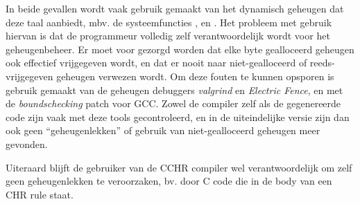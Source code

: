 In beide gevallen wordt vaak gebruik gemaakt van het dynamisch geheugen dat deze taal aanbiedt, mbv. de systeemfuncties ,  en . Het probleem met gebruik hiervan is dat de programmeur volledig zelf verantwoordelijk wordt voor het geheugenbeheer. Er moet voor gezorgd worden dat elke byte gealloceerd geheugen ook effectief vrijgegeven wordt, en dat er nooit naar niet-gealloceerd of reeds-vrijgegeven geheugen verwezen wordt. Om deze fouten te kunnen opsporen is gebruik gemaakt van de geheugen debuggers {\em valgrind} en {\em Electric Fence}, en met de  {\em boundschecking} patch voor GCC. Zowel de compiler zelf als de gegenereerde code zijn vaak met deze tools gecontroleerd, en in de uiteindelijke versie zijn dan ook geen ``geheugenlekken'' of gebruik van niet-gealloceerd geheugen meer gevonden.

Uiteraard blijft de gebruiker van de CCHR compiler wel verantwoordelijk om zelf geen geheugenlekken te veroorzaken, bv. door C code die in de body van een CHR rule staat.

% 

